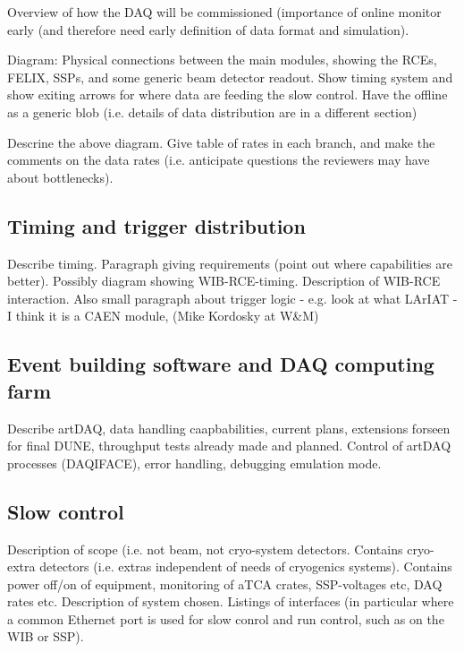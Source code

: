 Overview of how the DAQ will be commissioned (importance of online monitor early (and therefore need early definition of data format and simulation). 

Diagram: Physical connections between the main modules, showing the RCEs, FELIX, SSPs, and some generic beam detector readout.  Show timing system and show exiting arrows for where data are feeding the slow control.  Have the offline as a generic blob (i.e. details of data distribution are in a different section)

Descrine the above diagram.  Give table of rates in each branch, and make the comments on the data rates (i.e. anticipate questions the reviewers may have about bottlenecks).

\subsection{Timing and trigger distribution}

Describe timing.  Paragraph giving requirements (point out where capabilities are better).  Possibly diagram showing WIB-RCE-timing.  Description of WIB-RCE interaction.  Also small paragraph about trigger logic - e.g. look at what LArIAT - I think it is a CAEN module, (Mike Kordosky at W\&M)

\subsection{Event building software and DAQ computing farm }

Describe artDAQ, data handling caapbabilities, current plans, extensions forseen for final DUNE, throughput tests already made and planned.  Control of artDAQ processes (DAQIFACE), error handling, debugging emulation mode.

\subsection{Slow control}

Description of scope (i.e. not beam, not cryo-system detectors.  Contains cryo-extra detectors (i.e. extras independent of needs of cryogenics systems).  Contains power off/on of equipment, monitoring of aTCA crates, SSP-voltages etc, DAQ rates etc.   Description of system chosen.  Listings of interfaces (in particular where a common Ethernet port is used for slow conrol and run control, such as on the WIB or SSP). 

